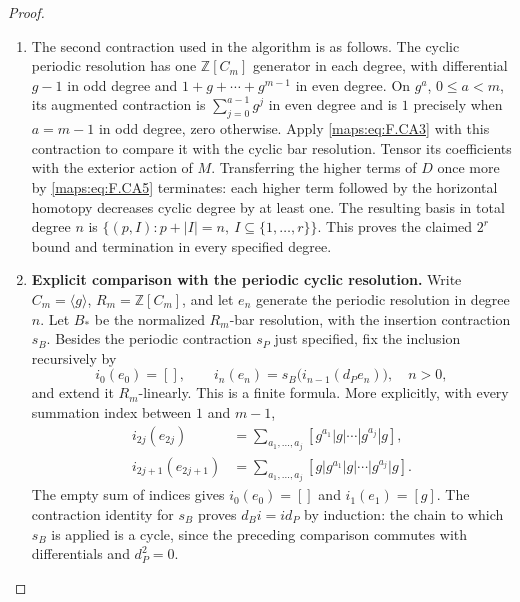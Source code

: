 \documentclass[11pt,a4paper]{article}
\numberwithin{equation}{section}
\theoremstyle{definition}
\begin{document}
\begin{proof}
\begin{enumerate}[label=\arabic*.]
\item The second contraction used in the algorithm is as follows.  The cyclic periodic resolution has one
$\mathbb Z[C_m]$ generator in each degree, with differential
$g-1$ in odd degree and $1+g+\cdots+g^{m-1}$ in even degree.
On $g^a$, $0\leq a<m$, its augmented contraction is
$\sum_{j=0}^{a-1}g^j$ in even degree and is $1$ precisely when
$a=m-1$ in odd degree, zero otherwise.
Apply \eqref{maps:eq:F.CA3} with this contraction to compare it with the
cyclic bar resolution.  Tensor its coefficients with the
exterior action of $M$.  Transferring the higher terms of $D$
once more by \eqref{maps:eq:F.CA5} terminates: each higher term followed by
the horizontal homotopy decreases cyclic degree by at least
one.  The resulting basis in total degree $n$ is
$\{(p,I):p+|I|=n,\ I\subseteq\{1,\ldots,r\}\}$.
This proves the claimed $2^r$ bound and termination in every
specified degree.

\item \par\medskip\noindent\textbf{Explicit comparison with the periodic cyclic resolution.}\quad 
\hypertarget{tag-02J1}{}\label{maps:mapsF:repair:cyclic-inclusion}
Write $C_m=\langle g\rangle$, $R_m=\mathbb Z[C_m]$, and let
$e_n$ generate the periodic resolution in degree $n$.
Let $B_*$ be the normalized $R_m$-bar resolution, with the
insertion contraction $s_B$.  Besides the periodic contraction
$s_P$ just specified, fix the inclusion recursively by
\[
 i_0(e_0)=[],\qquad
 i_n(e_n)=s_B\bigl(i_{n-1}(d_Pe_n)\bigr),
 \quad n>0,
\]
and extend it $R_m$-linearly.  This is a finite formula.  More
explicitly, with every summation index between $1$ and $m-1$,
\[
\begin{split}
 i_{2j}(e_{2j})
   &=\sum_{a_1,\ldots,a_j}
       [g^{a_1}|g|\cdots|g^{a_j}|g],\\
 i_{2j+1}(e_{2j+1})
   &=\sum_{a_1,\ldots,a_j}
       [g|g^{a_1}|g|\cdots|g^{a_j}|g].
\end{split}
\]
The empty sum of indices gives $i_0(e_0)=[]$ and
$i_1(e_1)=[g]$.  The contraction identity for $s_B$ proves
$d_Bi=id_P$ by induction: the chain to which $s_B$ is applied
is a cycle, since the preceding comparison commutes with
differentials and $d_P^2=0$.


\end{enumerate}
\end{proof}
\end{document}

